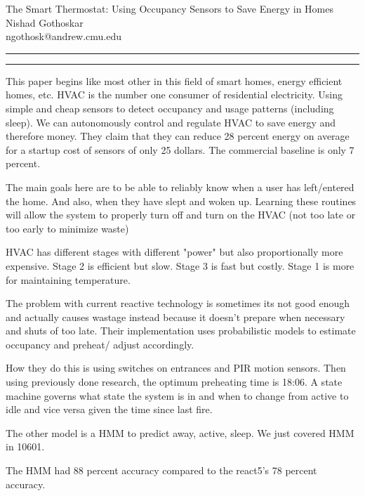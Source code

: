 \documentclass[11pt]{article}
\newcommand{\question}[2] {\vspace{.25in} \hrule\vspace{0.5em}
	\noindent{\bf #1: #2} \vspace{0.5em}
	\hrule \vspace{.10in}}
\newcommand{\myname}{Nishad Gothoskar}
\newcommand{\myandrew}{ngothosk}
\begin{document}
	
	\medskip                        %
	
	\thispagestyle{plain}
	\begin{center}                  %
		{\Large The Smart Thermostat: Using Occupancy Sensors to Save Energy in Homes
} \\
		\myname \\
		\myandrew @andrew.cmu.edu\\
	\end{center}
	
	\question{1}{Summary}
	\quad This paper begins like most other in this field of smart homes, energy efficient homes, etc. HVAC is the number one consumer of residential electricity. Using simple and cheap sensors to detect occupancy and usage patterns (including sleep). We can autonomously control and regulate HVAC to save energy and therefore money. They claim that they can reduce 28 percent energy on average for a startup cost of sensors of only 25 dollars. The commercial baseline is only 7 percent.
	
	\quad The main goals here are to be able to reliably know when a user has left/entered the home. And also, when they have slept and woken up. Learning these routines will allow the system to properly turn off and turn on the HVAC (not too late or too early to minimize waste)
	
	\quad HVAC has different stages with different "power" but also proportionally more expensive. Stage 2 is efficient but slow. Stage 3 is fast but costly. Stage 1 is more for maintaining temperature. 
	
	\quad The problem with current reactive technology is sometimes its not good enough and actually causes wastage instead because it doesn't prepare when necessary and shuts of too late. Their implementation uses probabilistic models to estimate occupancy and preheat/ adjust accordingly.
	
	\quad How they do this is using switches on entrances and PIR motion sensors. Then using previously done research, the optimum preheating time is 18:06. A state machine governs what state the system is in and when to change from active to idle and vice versa given the time since last fire.
	
	\quad The other model is a HMM to predict away, active, sleep. We just covered HMM in 10601.
	
	\quad The HMM had 88 percent accuracy compared to the react5's 78 percent accuracy.
	
\end{document}
